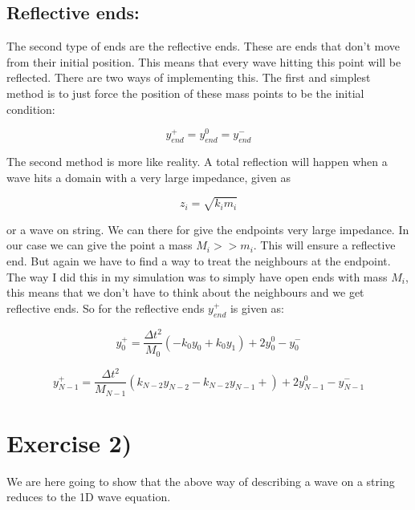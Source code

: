 \documentclass[a4paper,norsk, 10pt]{article}
\begin{document}
\subsection*{Reflective ends:}

The second type of ends are the reflective ends. These are ends that don't move from their initial position. This means that every wave hitting this point will be reflected. There are two ways of implementing this. The first and simplest method is to just force the position of these mass points to be the initial condition:

\begin{equation}
y_{end}^+ = y_{end}^0 = y_{end}^- 
\end{equation}

The second method is more like reality. A total reflection will happen when a wave hits a domain with a very large impedance, given as 

\begin{equation}
z_i = \sqrt{k_im_i}
\end{equation}

or a wave on string. We can there for give the endpoints very large impedance. In our case we can give the point a mass $M_i >> m_i$. This will ensure a reflective end. But again we have to find a way to treat the neighbours at the endpoint. The way I did this in my simulation was to simply have open ends with mass $M_i$, this means that we don't have to think about the neighbours and we get reflective ends. So for the reflective ends $y_{end}^+$ is given as:

\begin{equation}
y_0^+ = \frac{\Delta t^2}{M_0}\left(-k_0y_0 + k_0y_{1}\right) + 2y_0^0 -y_0^-
\end{equation}

\begin{equation}
y_{N-1}^+ = \frac{\Delta t^2}{M_{N-1}}\left(k_{N-2}y_{N-2} - k_{N-2} y_{N-1} + \right) + 2y_{N-1}^0 -y_{N-1}^-
\end{equation}


\newpage

\section{Exercise 2)}

We are here going to show that the above way of describing a wave on a string reduces to the 1D wave equation.\\
\end{document}
